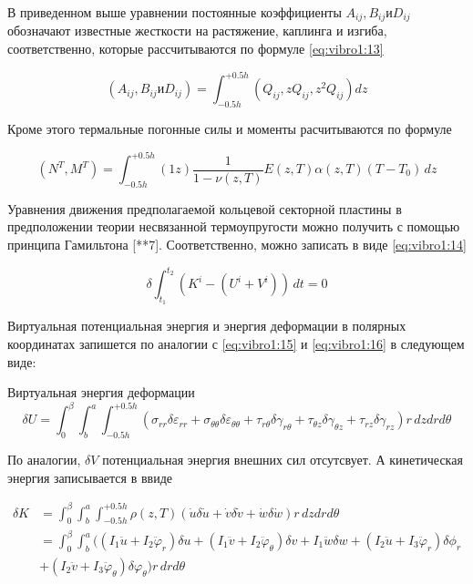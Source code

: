 В приведенном выше уравнении постоянные коэффициенты \(A_{i j} , B_{i j} и D_{i j}\) обозначают известные жесткости на растяжение, каплинга и изгиба, соответственно, которые рассчитываются по формуле \cref{eq:vibro1:13}

\begin{equation}
	\label{eq:vibro2:10}
	\left ( A_{i j} , B_{i j} и D_{i j} \right ) = \int_{-0.5 h}^{+0.5h} \left ( Q_{i j} , zQ_{i j} , z^2 Q_{i j} \right ) dz
\end{equation}

Кроме этого термальные погонные силы и моменты расчитываются по формуле

\begin{equation}
	\label{eq:vibro2:11}
	\left ( N^T, M^T \right ) = \int_{-0.5 h}^{+0.5 h} \left ( 1 z \right ) \frac{1}{1-\nu(z, T)} E(z, T) \alpha(z, T) (T-T_0) \, dz
\end{equation}


Уравнения движения предполагаемой кольцевой секторной пластины в предположении теории несвязанной термоупругости можно получить с помощью принципа Гамильтона [**7].  Соответственно, можно записать в виде \cref{eq:vibro1:14}

\begin{equation}
	\label{eq:vibro2:12}
		\delta \int_{t_1}^{t_2} \left (K^i - \left ( U^i +V^i \right ) \right )\,dt = 0
\end{equation}


Виртуальная потенциальная энергия и энергия деформации в полярных координатах запишется по аналогии с \cref{eq:vibro1:15} и \cref{eq:vibro1:16} в следующем виде:

Виртуальная энергия деформации
\begin{equation}
	\label{eq:vibro2:13}
	\delta U = \int_0^{\beta} \int_b^{a}  \int_{-0.5h}^{+0.5h}  \left ( \sigma_{rr} \delta \varepsilon_{rr} + \sigma_{\theta \theta} \delta \varepsilon_{\theta \theta} +  \tau_{r \theta} \delta \gamma_{r \theta} + \tau_{\theta z} \delta \gamma_{\theta z} +  \tau_{r z} \delta \gamma_{r z} \right ) r\, dz dr d\theta
\end{equation}
 
По аналогии, \(\delta V\) потенциальная энергия внешних сил отсутсвует. А кинетическая энергия записывается в ввиде


\begin{equation}
	\label{eq:vibro2:14}
	\begin{split}
	\delta K &= \int_0^{\beta} \int_b^{a}  \int_{-0.5h}^{+0.5h}   \rho (z, T)  ( \dot{u} \delta \dot{u} +  \dot{v} \delta \dot{v} +  \dot{w} \delta \dot{w} )  r\, dz dr d\theta
	\\
	&=\int_0^{\beta} \int_b^{a}   (  (I_1 \ddot{u} + I_2 \ddot{\varphi}_r)\delta u +(I_1 \ddot{v} + I_2 \ddot{\varphi}_{\theta}) \delta v +I_1 \ddot{w} \delta w + (I_2 \ddot{u} + I_3 \ddot{\varphi}_r) \delta \phi_r
	\\
	 &+(I_2 \ddot{v} + I_3 \ddot{\varphi}_{\theta}) \delta \varphi_{\theta}  )  r\, dr d\theta
	\end{split}
\end{equation}

